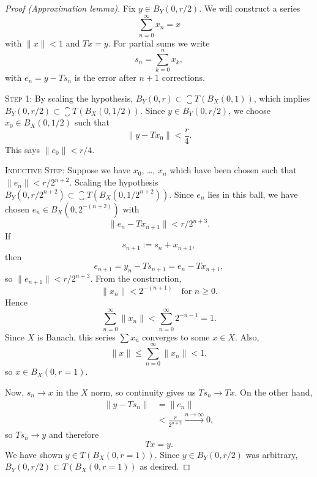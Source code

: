 \begin{proof}[Proof (Approximation lemma)]
Fix $y\in B_{Y}(0,r/2)$. We will construct a series
\begin{equation}
\sum^{\infty}_{n=0}x_{n}=x
\end{equation}
with $\|x\|<1$ and $Tx=y$. For partial sums we write
\begin{equation}
s_{n}=\sum^{n}_{k=0}x_{k},
\end{equation}
with $e_{n}=y-Ts_{n}$ is the error after $n+1$ corrections.

\textsc{Step 1}: By scaling the hypothesis, $B_{Y}(0,r)\subset\closure{T(B_{X}(0,1))}$,
which implies $B_{Y}(0,r/2)\subset\closure{T(B_{X}(0,1/2))}$. Since
$y\in B_{Y}(0,r/2)$, we choose $x_{0}\in B_{X}(0,1/2)$ such that
\begin{equation}
\|y-Tx_{0}\|<\frac{r}{4}.
\end{equation}
This says $\|e_{0}\|<r/4$.

\textsc{Inductive Step}: Suppose we have $x_{0}$, \dots, $x_{n}$ which
have been chosen such that $\|e_{n}\|<r/2^{n+2}$. Scaling the hypothesis
$B_{Y}(0,r/2^{n+2})\subset\closure{T(B_{X}(0,1/2^{n+2}))}$. Since
$e_{n}$ lies in this ball, we have chosen $e_{n}\in B_{X}(0,2^{-(n+2)})$
with
\begin{equation}
\|e_{n}-Tx_{n+1}\|<r/2^{n+3}.
\end{equation}
If
\begin{equation}
s_{n+1}:=s_{n}+x_{n+1},
\end{equation}
then
\begin{equation}
e_{n+1}=y_{n}-Ts_{n+1}=e_{n}-Tx_{n+1},
\end{equation}
so $\|e_{n+1}\|<r/2^{n+3}$. From the construction,
\begin{equation}
\|x_{n}\|<2^{-(n+1)}\quad\mbox{for }n\geq0.
\end{equation}
Hence
\begin{equation}
\sum^{\infty}_{n=0}\|x_{n}\|<\sum^{\infty}_{n=0}2^{-n-1}=1.
\end{equation}
Since $X$ is Banach, this series $\sum x_{n}$ converges to some $x\in
X$. Also,
\begin{equation}
\|x\|\leq\sum^{\infty}_{n=0}\|x_{n}\|<1,
\end{equation}
so $x\in B_{X}(0,r=1)$.

Now, $s_{n}\to x$ in the $X$ norm, so continuity gives us $Ts_{n}\to Tx$.
On the other hand,
\begin{subequations}
  \begin{align}
\|y-Ts_{n}\| &= \|e_{n}\|\\
&<\frac{r}{2^{n+2}}\xrightarrow{n\to\infty}0,
  \end{align}
\end{subequations}
so $Ts_{n}\to y$ and therefore
\begin{equation}
Tx=y.
\end{equation}
We have shown $y\in T(B_{X}(0,r=1))$. Since $y\in B_{Y}(0,r/2)$
was arbitrary, $B_{Y}(0,r/2)\subset T(B_{X}(0,r=1))$ as desired.
\end{proof}

